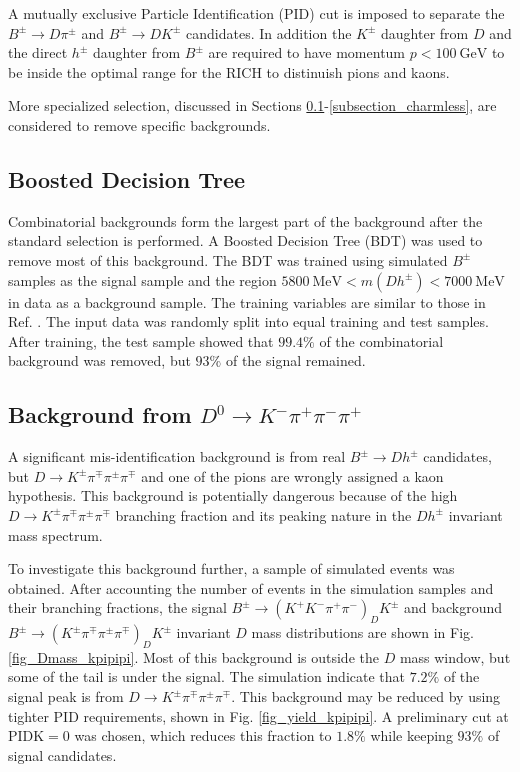 \documentclass[12pt, a4paper, notitlepage, onecolumn]{article}
\numberwithin{equation}{section}
\begin{document}
A mutually exclusive Particle Identification (PID) cut is imposed to separate the $B^\pm\to D\pi^\pm$ and $B^\pm\to DK^\pm$ candidates. In addition the $K^\pm$ daughter from $D$ and the direct $h^\pm$ daughter from $B^\pm$ are required to have momentum $p < \SI{100}{\giga\eV}$ to be inside the optimal range for the RICH to distinuish pions and kaons.

More specialized selection, discussed in Sections \ref{subsection_BDT}-\ref{subsection_charmless}, are considered to remove specific backgrounds.

\subsection{Boosted Decision Tree}
\label{subsection_BDT}
\noindent Combinatorial backgrounds form the largest part of the background after the standard selection is performed. A Boosted Decision Tree (BDT) was used to remove most of this background. The BDT was trained using simulated $B^\pm$ samples as the signal sample and the region $\SI{5800}{\mega\eV} < m(Dh^\pm) < \SI{7000}{\mega\eV}$ in data as a background sample. The training variables are similar to those in Ref. \cite{cite_LHCbGGSZKSpipi}. The input data was randomly split into equal training and test samples. After training, the test sample showed that $99.4\%$ of the combinatorial background was removed, but $93\%$ of the signal remained.

\subsection{Background from \texorpdfstring{$D^0\to K^-\pi^+\pi^-\pi^+$}{D->Kpipipi}}
\label{subsection_kpipipi}
\noindent A significant mis-identification background is from real $B^\pm\to Dh^\pm$ candidates, but $D\to K^\pm\pi^\mp\pi^\pm\pi^\mp$ and one of the pions are wrongly assigned a kaon hypothesis. This background is potentially dangerous because of the high $D\to K^\pm\pi^\mp\pi^\pm\pi^\mp$ branching fraction and its peaking nature in the $Dh^\pm$ invariant mass spectrum.

To investigate this background further, a sample of simulated events was obtained. After accounting the number of events in the simulation samples and their branching fractions, the signal $B^\pm\to(K^+K^-\pi^+\pi^-)_DK^\pm$ and background $B^\pm\to(K^\pm\pi^\mp\pi^\pm\pi^\mp)_DK^\pm$ invariant $D$ mass distributions are shown in Fig. \ref{fig_Dmass_kpipipi}. Most of this background is outside the $D$ mass window, but some of the tail is under the signal. The simulation indicate that $7.2\%$ of the signal peak is from $D\to K^\pm\pi^\mp\pi^\pm\pi^\mp$. This background may be reduced by using tighter PID requirements, shown in Fig. \ref{fig_yield_kpipipi}. A preliminary cut at $\text{PIDK} = 0$ was chosen, which reduces this fraction to $1.8\%$ while keeping $93\%$ of signal candidates.
\end{document}
